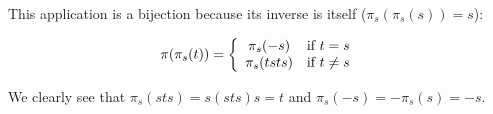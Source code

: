 This application is a bijection because its inverse is itself ($\pi_s(\pi_s(s)) = s$):

\begin{equation}
  \pi(\pi_s(t)) = \left \{
  \begin{array}{c @{} c}
      \pi_s(-s) \quad &\text{if } t = s \\
      \pi_s(tsts) \quad &\text{if } t \neq s \\
  \end{array}\right.
\end{equation}

We clearly see that $\pi_s(sts) = s(sts)s = t$ and $\pi_s(-s) = -\pi_s(s) = -s$.


